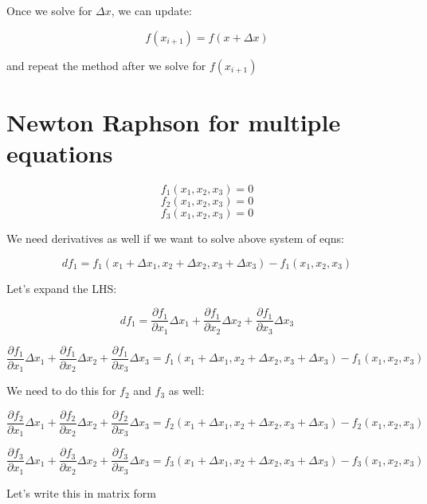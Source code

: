 \documentclass[12pt]{article}
\renewcommand{\_}{\kern-1.5pt\textunderscore\kern-1.5pt}
\begin{document}
Once we solve for $\Delta x$, we can update:

$$f(x_{i+1}) = f(x + \Delta x) $$

and repeat the method after we solve for $f(x_{i+1})$
\section{Newton Raphson for multiple equations}

$$f_1 (x_1 ,x_2, x_3) = 0$$
$$f_2 (x_1 ,x_2, x_3) = 0$$
$$f_3 (x_1 ,x_2, x_3) = 0$$

We need derivatives as well if we want to solve above system of eqns:

$$df_1 = f_1 (x_1+\Delta x_1,x_2+\Delta x_2 , x_3+\Delta x_3) - f_1 (x_1,x_2,x_3)$$

Let's expand the LHS:

$$df_1 = \frac{\partial f_1}{\partial x_1} \Delta x_1 + \frac{\partial f_1}{\partial x_2} \Delta x_2 + \frac{\partial f_1}{\partial x_3} \Delta x_3$$

$$\frac{\partial f_1}{\partial x_1} \Delta x_1 + \frac{\partial f_1}{\partial x_2} \Delta x_2 + \frac{\partial f_1}{\partial x_3} \Delta x_3 = f_1 (x_1+\Delta x_1,x_2+\Delta x_2 , x_3+\Delta x_3) - f_1 (x_1,x_2,x_3)$$

We need to do this for $f_2$ and $f_3 $ as well:

$$\frac{\partial f_2}{\partial x_1} \Delta x_1 + \frac{\partial f_2}{\partial x_2} \Delta x_2 + \frac{\partial f_2}{\partial x_3} \Delta x_3 = f_2 (x_1+\Delta x_1,x_2+\Delta x_2 , x_3+\Delta x_3) - f_2 (x_1,x_2,x_3)$$

$$\frac{\partial f_3}{\partial x_1} \Delta x_1 + \frac{\partial f_3}{\partial x_2} \Delta x_2 + \frac{\partial f_3}{\partial x_3} \Delta x_3 = f_3 (x_1+\Delta x_1,x_2+\Delta x_2 , x_3+\Delta x_3) - f_3 (x_1,x_2,x_3)$$


Let's write this in matrix form
\end{document}
